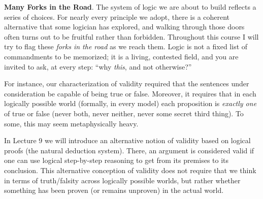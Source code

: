 \documentclass[options]{philosophersimprint}
\theoremstyle{definition}
\begin{document}
\textbf{Many Forks in the Road}. The system of logic we are about to build reflects a series of choices. For nearly every principle we adopt, there is a coherent alternative that some logician has explored, and walking through those doors often turns out to be fruitful rather than forbidden. Throughout this course I will try to flag these \textit{forks in the road} as we reach them. Logic is not a fixed list of commandments to be memorized; it is a living, contested field, and you are invited to ask, at every step: ``why \textit{this}, and not otherwise?''

For instance, our characterization of validity required that the sentences under consideration be capable of being true or false. Moreover, it requires that in each logically possible world (formally, in every model) each proposition is \textit{exactly one} of true or false (never both, never neither, never some secret third thing). To some, this may seem metaphysically heavy.

In Lecture 9 we will introduce an alternative notion of validity based on logical proofs (the natural deduction system). There, an argument is considered valid if one can use logical step-by-step reasoning to get from its premises to its conclusion. This alternative conception of validity does not require that we think in terms of truth/falsity across logically possible worlds, but rather whether something has been proven (or remains unproven) in the actual world.
\end{document}
